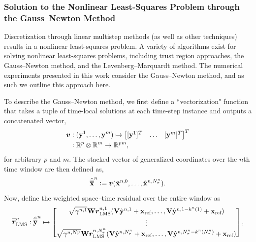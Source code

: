 \subsubsection{Solution to the Nonlinear Least-Squares Problem through the Gauss--Newton Method}
Discretization through linear multistep methods (as well as other techniques) 
results in a nonlinear least-squares problem.
A variety of algorithms exist for solving nonlinear  
least-squares problems, including trust region approaches, the Gauss–Newton method, and the Levenberg–Marquardt method.  
The numerical experiments presented in this work consider the Gauss--Newton method, and as such we outline this approach here. 

To describe the Gauss--Newton method, we first define a ``vectorization" function that takes a tuple of time-local solutions at each time-step instance and outputs 
a concatenated vector, 
\begin{align*}
 \unroll &\vcentcolon (\stateyDiscreteArg{1},\ldots,\stateyDiscreteArg{m} ) \mapsto \begin{bmatrix} [\stateyDiscreteArg{1}]^T & \ldots & [\stateyDiscreteArg{m}]^T \end{bmatrix}^T  \\
&\vcentcolon \RR{p} \otimes \RR{m} \rightarrow \RR{pm},
\end{align*}
for arbitrary $p$ and $m$. The stacked vector of generalized coordinates over the $n$th time window are then defined as, 
\begin{equation*}
\genstatecollocMatSlabArg{n} \defeq 
\unroll (\genstateDiscreteArg{n,0},\ldots,\genstateDiscreteArg{n,\nstepsArg{n}} ).
\end{equation*}
Now, define the weighted space--time residual over the entire window as
\begin{equation*}
\residLMSSlabArg{n} : \genstatecollocMatySlabArg{n} \mapsto \begin{bmatrix}
 \sqrt{\quadWeightsLMSScalarArg{n}{1} } \stweightingMatOneArg{n,1} \residLMSArg{n,1}( \basisspace \genstateyDiscreteArgnt{n,1} + \stateIntercept, \ldots,\basisspace \genstateyDiscreteArgnt{n,1 - k^n(1) }  + \stateIntercept) \\
\vdots \\
 \sqrt{\quadWeightsLMSScalarArg{n}{\nstepsArg{n}} } \stweightingMatOneArg{n,\nstepsArg{n}} \residLMSArg{n,\nstepsArg{n}}( \basisspace \genstateyDiscreteArgnt{n,\nstepsArg{n}} + \stateIntercept, \ldots,\basisspace \genstateyDiscreteArgnt{n,\nstepsArg{n} - k^n(\nstepsArg{n}) } + \stateIntercept) \\
\end{bmatrix},
\end{equation*}
